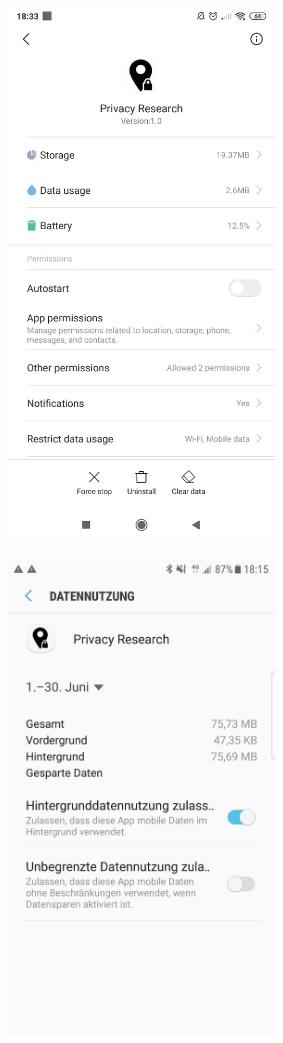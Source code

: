 \begin{center}
\includegraphics[width=200pt]{data/data-usage/data-usage6.jpeg}
\end{center}
\begin{center}
\includegraphics[width=200pt]{data/data-usage/data-usage7.jpeg}
\end{center}
